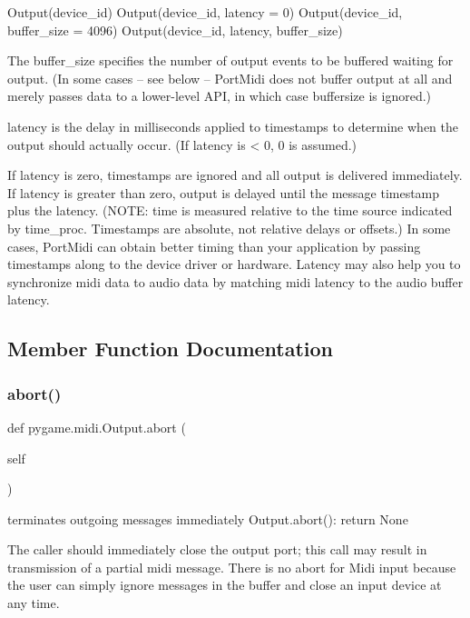 \begin{DoxyVerb}Output(device_id)
Output(device_id, latency = 0)
Output(device_id, buffer_size = 4096)
Output(device_id, latency, buffer_size)

The buffer_size specifies the number of output events to be
buffered waiting for output.  (In some cases -- see below --
PortMidi does not buffer output at all and merely passes data
to a lower-level API, in which case buffersize is ignored.)

latency is the delay in milliseconds applied to timestamps to determine
when the output should actually occur. (If latency is < 0, 0 is
assumed.)

If latency is zero, timestamps are ignored and all output is delivered
immediately. If latency is greater than zero, output is delayed until
the message timestamp plus the latency. (NOTE: time is measured
relative to the time source indicated by time_proc. Timestamps are
absolute, not relative delays or offsets.) In some cases, PortMidi
can obtain better timing than your application by passing timestamps
along to the device driver or hardware. Latency may also help you
to synchronize midi data to audio data by matching midi latency to
the audio buffer latency.
\end{DoxyVerb}
 

\subsection{Member Function Documentation}
\mbox{\label{classpygame_1_1midi_1_1_output_aa8cf09700f93a1f2e63ff5f4910b1f37}} 
\subsubsection{\texorpdfstring{abort()}{abort()}}
{\footnotesize\ttfamily def pygame.\+midi.\+Output.\+abort (\begin{DoxyParamCaption}\item[{}]{self }\end{DoxyParamCaption})}

\begin{DoxyVerb}terminates outgoing messages immediately
Output.abort(): return None

The caller should immediately close the output port;
this call may result in transmission of a partial midi message.
There is no abort for Midi input because the user can simply
ignore messages in the buffer and close an input device at
any time.
\end{DoxyVerb}
 \mbox{\label{classpygame_1_1midi_1_1_output_a02d64aa476b0936eaa1de20254c05017}} 

